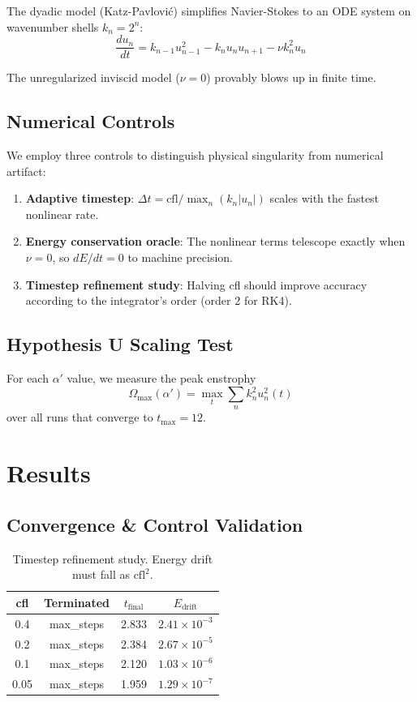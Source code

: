 \documentclass[11pt,a4paper]{article}
\begin{document}
The dyadic model (Katz-Pavlović) simplifies Navier-Stokes to an ODE system on
wavenumber shells $k_n = 2^n$:
\begin{equation}
\frac{du_n}{dt} = k_{n-1} u_{n-1}^2 - k_n u_n u_{n+1} - \nu k_n^2 u_n
\end{equation}

The unregularized inviscid model ($\nu=0$) provably blows up in finite time.

\subsection{Numerical Controls}

We employ three controls to distinguish physical singularity from numerical artifact:

\begin{enumerate}
\item \textbf{Adaptive timestep}: $\Delta t = \text{cfl} / \max_n(k_n|u_n|)$ scales
with the fastest nonlinear rate.

\item \textbf{Energy conservation oracle}: The nonlinear terms telescope exactly
when $\nu=0$, so $dE/dt = 0$ to machine precision.

\item \textbf{Timestep refinement study}: Halving cfl should improve
accuracy according to the integrator's order (order 2 for RK4).
\end{enumerate}

\subsection{Hypothesis U Scaling Test}

For each $\alpha'$ value, we measure the peak enstrophy
\[ \Omega_{\max}(\alpha') = \max_t \sum_n k_n^2 u_n^2(t) \]
over all runs that converge to $t_{\max} = 12$.

\section{Results}

\subsection{Convergence \& Control Validation}

\begin{table}[h]
\centering
\caption{Timestep refinement study. Energy drift must fall as $\text{cfl}^2$.}
\begin{tabular}{cccc}
\toprule
cfl & Terminated & $t_{\text{final}}$ & $E_{\text{drift}}$ \\
\midrule
0.4 & max\_steps & 2.833 & $2.41 \times 10^{-3}$ \\
0.2 & max\_steps & 2.384 & $2.67 \times 10^{-5}$ \\
0.1 & max\_steps & 2.120 & $1.03 \times 10^{-6}$ \\
0.05 & max\_steps & 1.959 & $1.29 \times 10^{-7}$ \\
\bottomrule
\end{tabular}
\end{table}
\end{document}
